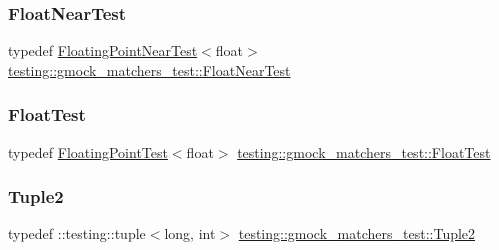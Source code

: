 \mbox{\label{namespacetesting_1_1gmock__matchers__test_a426b51f464dcb48033946e1bf3cc8795}} 
\subsubsection{\texorpdfstring{Float\+Near\+Test}{FloatNearTest}}
{\footnotesize\ttfamily typedef \hyperlink{classtesting_1_1gmock__matchers__test_1_1_floating_point_near_test}{Floating\+Point\+Near\+Test}$<$float$>$ \hyperlink{namespacetesting_1_1gmock__matchers__test_a426b51f464dcb48033946e1bf3cc8795}{testing\+::gmock\+\_\+matchers\+\_\+test\+::\+Float\+Near\+Test}}

\mbox{\label{namespacetesting_1_1gmock__matchers__test_a145329e433869625f9f0e98a0cdfd7b4}} 
\subsubsection{\texorpdfstring{Float\+Test}{FloatTest}}
{\footnotesize\ttfamily typedef \hyperlink{classtesting_1_1gmock__matchers__test_1_1_floating_point_test}{Floating\+Point\+Test}$<$float$>$ \hyperlink{namespacetesting_1_1gmock__matchers__test_a145329e433869625f9f0e98a0cdfd7b4}{testing\+::gmock\+\_\+matchers\+\_\+test\+::\+Float\+Test}}

\mbox{\label{namespacetesting_1_1gmock__matchers__test_a8b82c859cd28da9e7f7d4c6091a3165c}} 
\subsubsection{\texorpdfstring{Tuple2}{Tuple2}}
{\footnotesize\ttfamily typedef \+::testing\+::tuple$<$long, int$>$ \hyperlink{namespacetesting_1_1gmock__matchers__test_a8b82c859cd28da9e7f7d4c6091a3165c}{testing\+::gmock\+\_\+matchers\+\_\+test\+::\+Tuple2}}



